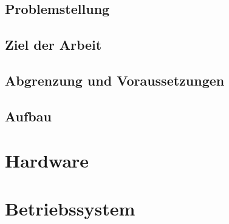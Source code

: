\documentclass[
    headings=optiontotocandhead,%
    oneside,
    numbers=noenddot,%
    toc=flat, %
    12pt, %
    titlepage, %
    parskip=full, %
    listof=totoc, %
    listof=flat, %
    numbers=noenddot, %
    bibliography=totoc, %
    a4paper,DIV=14,
    BCOR=15mm,
]{scrbook}
\begin{document}
\section{Problemstellung}\label{Problemstellung}

\renewcommand{\kapitelautor}{Autor: Clemens Scharwitzl}



\section{Ziel der Arbeit}\label{Ziel-der-Arbeit}

\renewcommand{\kapitelautor}{Autor: Florian Steiner, Clemens Scharwitzl, Dominik Nußbaumer}



\section{Abgrenzung und Voraussetzungen}\label{Abgrenzung-und-Voraussetzungen}

\renewcommand{\kapitelautor}{Autor: Florian Steiner}



\section{Aufbau}\label{Aufbau}

\renewcommand{\kapitelautor}{Autor: Florian Steiner, Dominik Nußbaumer}



\chapter{Hardware}\label{Hardware}

\renewcommand{\kapitelautor}{Autor: Florian Steiner}




\chapter{Betriebssystem}\label{Betriebssystem}


\end{document}
